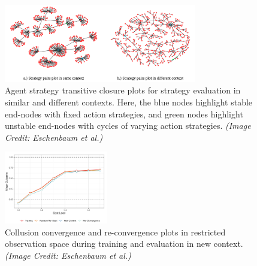\documentclass{article}
\begin{document}
\begin{figure}[h]
    \centering
    \includegraphics[width=0.75\textwidth]{study-one/transitive-strategy-pairs.png}
    \caption{Agent strategy transitive closure plots for strategy evaluation in similar and different contexts. Here, the blue nodes highlight stable end-nodes with fixed action strategies, and green nodes highlight unstable end-nodes with cycles of varying action strategies. \textit{(Image Credit: Eschenbaum et al.)}}
    \label{fig:transitive-strategy-pairs}
\end{figure}


\begin{figure}[h]
    \centering
    \includegraphics[width=0.4\textwidth]{study-one/restricted-observation-space.png}
    \caption{Collusion convergence and re-convergence plots in restricted observation space during training and evaluation in new context. \textit{(Image Credit: Eschenbaum et al.)}}
    \label{fig:restricted-observation-space}
\end{figure}
\end{document}
